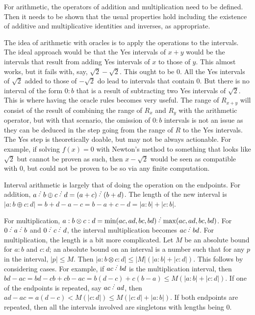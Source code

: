 \documentclass[12pt]{article}
\begin{document}
For arithmetic, the operators of addition and multiplication need to be defined. Then it needs to be shown that the usual properties hold including the existence of additive and multiplicative identities and inverses, as appropriate. 

The idea of arithmetic with oracles is to apply the operations to the intervals. The ideal approach would be that the Yes intervals of $x+y$ would be the intervals that result from adding Yes intervals of $x$ to those of $y$. This almost works, but it fails with, say, $\sqrt{2} - \sqrt{2}$. This ought to be 0. All the Yes intervals of $\sqrt{2}$ added to those of $-\sqrt{2}$ do lead to intervals that contain 0. But there is no interval of the form $0:b$ that is a result of subtracting two Yes intervals of $\sqrt{2}$. This is where having the oracle rules becomes very useful. The range of $R_{x+y}$ will consist of the result of combining the range of $R_x$ and $R_y$ with the arithmetic operator, but with that scenario, the omission of $0:b$ intervals is not an issue as they can be deduced in the step going from the range of $R$ to the Yes intervals. The Yes step is theoretically doable, but may not be always actionable. For example, if solving $f(x)=0$ with Newton's method to something that looks like $\sqrt{2}$ but cannot be proven as such, then $x - \sqrt{2}$ would be seen as compatible with 0, but could not be proven to be so via any finite computation. 

Interval arithmetic is largely that of doing the operation on the endpoints. For addition, $a \lte b \oplus c \lte d = (a+c) \lte (b+d)$. The length of the new interval is $|a:b \oplus c:d| = b+d - a- c = b-a+ c-d = |a:b|+|c:b|$. 

For multiplication, $a:b \otimes c:d = \min(ac, ad, bc, bd)\lte \max(ac, ad, bc, bd)$. For $0 \lte a \lte b$ and $0 \lte c \lte d$, the interval multiplication becomes $ac \lte bd$. For multiplication, the length is a bit more complicated. Let $M$ be an absolute bound for $a:b$ and $c:d$; an absolute bound on an interval is a number such that for any $p$ in the interval, $|p| \leq M$. Then $|a:b \otimes c:d| \leq |M|(|a:b| + |c:d|)$. This follows by considering cases. For example, if $ac \lte bd$ is the multiplication interval, then $bd - ac = bd - cb + cb - ac = b(d-c) + c (b-a) \leq M (|a:b| + |c:d|)$. If one of the endpoints is repeated, say $ac \lte ad$, then $ad - ac= a(d-c) < M (|c:d|) \leq M (|c:d| + |a:b|)$. If both endpoints are repeated, then all the intervals involved are singletons with lengths being 0. 
\end{document}

